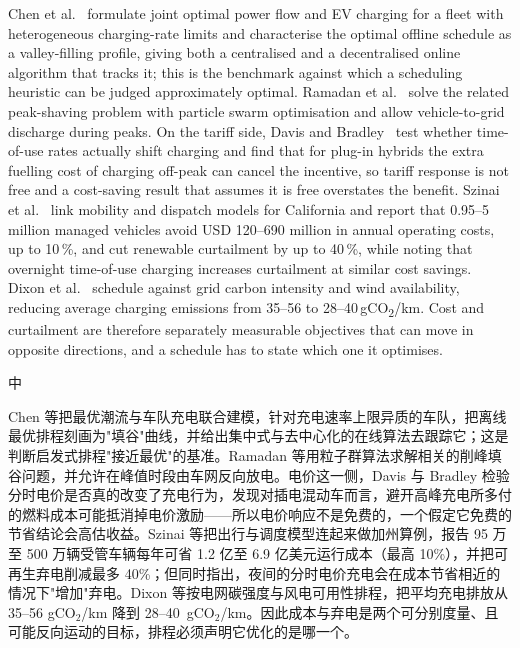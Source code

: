 \documentclass[10pt,a4paper]{article}
\newenvironment{zh}{%
  \par\vspace{1pt}%
  \begingroup
  \color{black!72}\small
  \setlength{\parskip}{0pt}%
  \noindent\textsf{\footnotesize 中}\hspace{3pt}\ignorespaces
}{%
  \par\endgroup\vspace{4pt}%
}
\begin{document}
Chen et al.~\cite{Chen2012ValleyFilling} formulate joint optimal power flow and EV charging for a
fleet with heterogeneous charging-rate limits and characterise the optimal offline schedule as a
valley-filling profile, giving both a centralised and a decentralised online algorithm that tracks
it; this is the benchmark against which a scheduling heuristic can be judged approximately optimal.
Ramadan et al.~\cite{Ramadan2018PeakShavingValleyFilling} solve the related peak-shaving problem
with particle swarm optimisation and allow vehicle-to-grid discharge during peaks. On the tariff
side, Davis and Bradley~\cite{Davis2012TOURatesEfficacy} test whether time-of-use rates actually
shift charging and find that for plug-in hybrids the extra fuelling cost of charging off-peak can
cancel the incentive, so tariff response is not free and a cost-saving result that assumes it is
free overstates the benefit. Szinai et al.~\cite{Szinai2020ReducedGridOperatingCosts} link mobility
and dispatch models for California and report that 0.95--5 million managed vehicles avoid
USD 120--690 million in annual operating costs, up to 10\,\%, and cut renewable curtailment by up
to 40\,\%, while noting that overnight time-of-use charging increases curtailment at similar cost
savings. Dixon et al.~\cite{Dixon2020MinimiseEmissionsWindCurtailment} schedule against grid carbon
intensity and wind availability, reducing average charging emissions from 35--56 to
28--40\,gCO\textsubscript{2}/km. Cost and curtailment are therefore separately measurable
objectives that can move in opposite directions, and a schedule has to state which one it
optimises.

\begin{zh}
Chen 等把最优潮流与车队充电联合建模，针对充电速率上限异质的车队，把离线最优排程刻画为"填谷"曲线，并给出集中式与去中心化的在线算法去跟踪它；这是判断启发式排程"接近最优"的基准。Ramadan 等用粒子群算法求解相关的削峰填谷问题，并允许在峰值时段由车网反向放电。电价这一侧，Davis 与 Bradley 检验分时电价是否真的改变了充电行为，发现对插电混动车而言，避开高峰充电所多付的燃料成本可能抵消掉电价激励——所以电价响应不是免费的，一个假定它免费的节省结论会高估收益。Szinai 等把出行与调度模型连起来做加州算例，报告 95 万至 500 万辆受管车辆每年可省 1.2 亿至 6.9 亿美元运行成本（最高 10\%），并把可再生弃电削减最多 40\%；但同时指出，夜间的分时电价充电会在成本节省相近的情况下"增加"弃电。Dixon 等按电网碳强度与风电可用性排程，把平均充电排放从 35--56 gCO$_2$/km 降到 28--40~gCO$_2$/km。因此成本与弃电是两个可分别度量、且可能反向运动的目标，排程必须声明它优化的是哪一个。
\end{zh}
\end{document}
